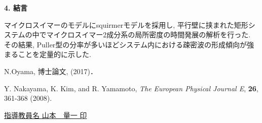 \documentclass[twocolumns,10pt,a4j]{jarticle}
\begin{document}
    \noindent
       {\bf \large 4. 結言}
       \par マイクロスイマーのモデルにsquirmerモデルを採用し, 平行壁に挟まれた矩形システムの中でマイクロスイマー2成分系の局所密度の時間発展の解析を行った. その結果, Puller型の分率が多いほどシステム内における疎密波の形成傾向が強まることを定量的に示した.

       \vspace{-7.5truemm}
       \renewcommand{\refname}{\normalsize 参考文献\vspace{-3truemm}}
       \begin{thebibliography}{9}
         N.Oyama, 博士論文, (2017)．\\
         \vspace{-7truemm}
        
         Y. Nakayama, K. Kim, and R. Yamamoto, \textit{The European Physical Journal E}, \textbf{26}, 361-368 (2008).\\
       \end{thebibliography}
       \vspace{-7truemm}
       \centering
       \underline{指導教員名\hspace{10truemm} 山本　量一 \hspace{20truemm} 印}
  
\end{document}
